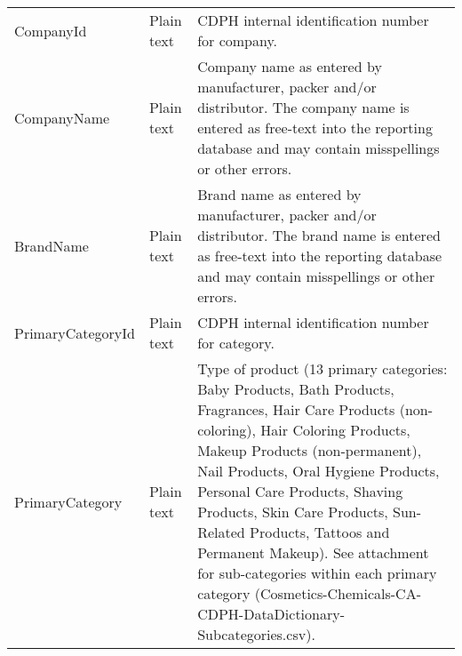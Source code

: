 \begin{table}[]
\begin{tabular}{@{}lll@{}}
CompanyId              & Plain text & CDPH internal identification number for company.                                                                                                                                                                                                                                                                                                                                                                                                                      \\
CompanyName            & Plain text & Company name as entered by manufacturer, packer and/or distributor. The company name is entered as free-text into the reporting database and may contain misspellings or other errors.                                                                                                                                                                                                                                                                                \\
BrandName              & Plain text & Brand name as entered by manufacturer, packer and/or distributor. The brand name is entered as free-text into the reporting database and may contain misspellings or other errors.                                                                                                                                                                                                                                                                                    \\
PrimaryCategoryId      & Plain text & CDPH internal identification number for category.                                                                                                                                                                                                                                                                                                                                                                                                                     \\
PrimaryCategory        & Plain text & Type of product (13 primary categories: Baby Products, Bath Products, Fragrances, Hair Care Products (non-coloring), Hair Coloring Products, Makeup Products (non-permanent), Nail Products, Oral Hygiene Products, Personal Care Products, Shaving Products, Skin Care Products, Sun-Related Products, Tattoos and Permanent Makeup). See attachment for sub-categories within each primary category (Cosmetics-Chemicals-CA-CDPH-DataDictionary-Subcategories.csv). \\

\end{tabular}
\end{table}
